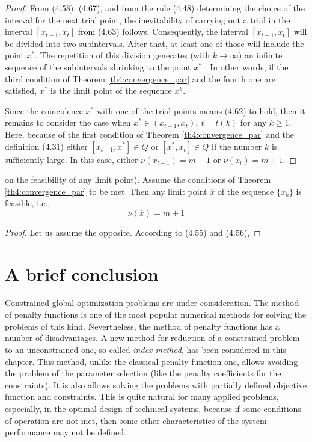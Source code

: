 \documentclass[graybox]{svmult}
\begin{document}
\begin{proof}
  From (4.58), (4.67), and from the rule (4.48) determining the choice of the interval for the next trial point, the inevitability of carrying out a trial in the interval $[x_{t-1},x_t]$ from (4.63) follows. Consequently, the interval $[x_{t-1},x_t]$ will be divided into two subintervals. After that, at least one of those will include the point $x^*$. The repetition of this division generates (with $k\to\infty$) an infinite sequence of the subintervals shrinking to the point $x^*$ . In other words, if the third condition of Theorem \ref{th4:convergence_par} and the fourth one are satisfied, $x^*$ is the limit point of the sequence ${x^k}$.

  Since the coincidence $x^*$ with one of the trial points means (4.62) to hold, then it remains to consider the case when $x^*\in(x_{t- 1} ,x_t ),\: t=t(k)$ for any $k\ge 1$. Here, because of the first condition of Theorem \ref{th4:convergence_par} and the definition (4.31) either $[x_{t-1},x^*]\in Q$ or $[x^* ,x_t]\in Q$ if the number $k$ is sufficiently large. In this case, either $\nu(x_{t-1})=m+1$ or $\nu (x_t )=m+1.$
\end{proof}

\begin{lemma}
  on the feasibility of any limit point). Assume the conditions of Theorem \ref{th4:convergence_par} to be met. Then any limit point $\overline x$ of the sequence $\{x_k\}$ is feasible, i.e.,
  \begin{equation}
    \nu(\overline x)=m+1
  \end{equation}
\end{lemma}

\begin{proof}
  Let us assume the opposite. According to (4.55) and (4.56),
\end{proof}

\section*{A brief conclusion}
Constrained global optimization problems are under consideration. The method of penalty functions is one of the most popular numerical methods for solving the problems of this kind. Nevertheless, the method of penalty functions has a number of disadvantages. A new method for reduction of a constrained problem to an unconstrained one, so called \emph{index method}, has been considered in this chapter. This method, unlike the classical penalty function one, allows avoiding the problem of the parameter selection (like the penalty coefficients for the constraints). It is also allows solving the problems with partially defined objective function and constraints. This is quite natural for many applied problems, especially, in the optimal design of technical systems, because if some conditions of operation are not met, then some other characteristics of the system performance may not be defined.
\end{document}

